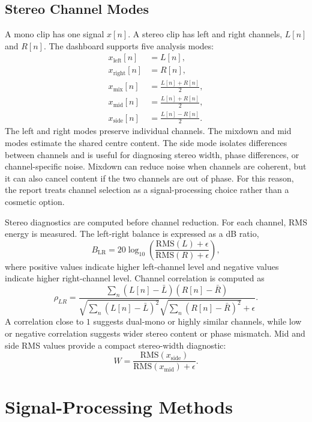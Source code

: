 ﻿\documentclass[11pt,a4paper]{article}
\begin{document}
\subsection{Stereo Channel Modes}
A mono clip has one signal $x[n]$. A stereo clip has left and right channels, $L[n]$ and $R[n]$. The dashboard supports five analysis modes:
\begin{align}
    x_{\mathrm{left}}[n] &= L[n], \\
    x_{\mathrm{right}}[n] &= R[n], \\
    x_{\mathrm{mix}}[n] &= \frac{L[n]+R[n]}{2}, \\
    x_{\mathrm{mid}}[n] &= \frac{L[n]+R[n]}{2}, \\
    x_{\mathrm{side}}[n] &= \frac{L[n]-R[n]}{2}.
\end{align}
The left and right modes preserve individual channels. The mixdown and mid modes estimate the shared centre content. The side mode isolates differences between channels and is useful for diagnosing stereo width, phase differences, or channel-specific noise. Mixdown can reduce noise when channels are coherent, but it can also cancel content if the two channels are out of phase. For this reason, the report treats channel selection as a signal-processing choice rather than a cosmetic option.

Stereo diagnostics are computed before channel reduction. For each channel, RMS energy is measured. The left-right balance is expressed as a dB ratio,
\begin{equation}
    B_{\mathrm{LR}} = 20\log_{10}\left(\frac{\mathrm{RMS}(L)+\epsilon}{\mathrm{RMS}(R)+\epsilon}\right),
\end{equation}
where positive values indicate higher left-channel level and negative values indicate higher right-channel level. Channel correlation is computed as
\begin{equation}
    \rho_{LR} = \frac{\sum_n (L[n]-\bar{L})(R[n]-\bar{R})}{\sqrt{\sum_n (L[n]-\bar{L})^2}\sqrt{\sum_n (R[n]-\bar{R})^2}+\epsilon}.
\end{equation}
A correlation close to $1$ suggests dual-mono or highly similar channels, while low or negative correlation suggests wider stereo content or phase mismatch. Mid and side RMS values provide a compact stereo-width diagnostic:
\begin{equation}
    W = \frac{\mathrm{RMS}(x_{\mathrm{side}})}{\mathrm{RMS}(x_{\mathrm{mid}})+\epsilon}.
\end{equation}

\section{Signal-Processing Methods}
\end{document}
